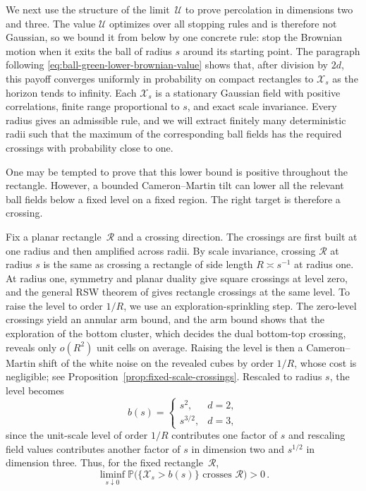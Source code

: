 \documentclass[11pt]{amsart}
\theoremstyle{plain}
\theoremstyle{definition}
\renewcommand{\P}{\mathbb{P}}
\begin{document}
We next use the structure of the limit~$\mathcal{U}$ to prove percolation in dimensions two and three. The value $\mathcal U$ optimizes over all stopping rules and is therefore not Gaussian, so we bound it from below by one concrete rule: stop the Brownian motion when it exits the ball of radius $s$ around its starting point. The paragraph following \eqref{eq:ball-green-lower-brownian-value} shows that, after division by $2d$, this payoff converges uniformly in probability on compact rectangles to $\mathcal X_s$ as the horizon tends to infinity. Each $\mathcal X_s$ is a stationary Gaussian field with positive correlations, finite range proportional to $s$, and exact scale invariance. Every radius gives an admissible rule, and we will extract finitely many deterministic radii such that the maximum of the corresponding ball fields has the required crossings with probability close to one.

One may be tempted to prove that this lower bound is positive throughout the rectangle. However, a bounded Cameron--Martin tilt can lower all the relevant ball fields below a fixed level on a fixed region. The right target is therefore a crossing.

Fix a planar rectangle~$\mathcal R$ and a crossing direction. The crossings are first built at one radius and then amplified across radii. By scale invariance, crossing $\mathcal R$ at radius $s$ is the same as crossing a rectangle of side length $R\asymp s^{-1}$ at radius one. At radius one, symmetry and planar duality give square crossings at level zero, and the general RSW theorem of \citet[Theorem~1]{KohlerSchindlerTassion} gives rectangle crossings at the same level. To raise the level to order $1/R$, we use an exploration-sprinkling step. The zero-level crossings yield an annular arm bound, and the arm bound shows that the exploration of the bottom cluster, which decides the dual bottom-top crossing, reveals only $o(R^2)$ unit cells on average. Raising the level is then a Cameron--Martin shift of the white noise on the revealed cubes by order $1/R$, whose cost is negligible; see Proposition~\ref{prop:fixed-scale-crossings}.
Rescaled to radius $s$, the level becomes
\[
    b(s)=
    \begin{cases}
        s^2, & d=2,\\
        s^{3/2}, & d=3,
    \end{cases}
\]
since the unit-scale level of order $1/R$ contributes one factor of $s$ and rescaling field values contributes another factor of $s$ in dimension two and $s^{1/2}$ in dimension three. Thus, for the fixed rectangle~$\mathcal R$,
\[
    \liminf_{s\downarrow0}
    \P\bigl(\{\mathcal X_s>b(s)\}\text{ crosses }\mathcal R\bigr)>0\, .
\]
\end{document}
